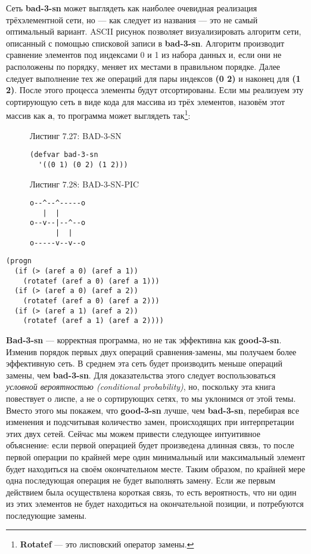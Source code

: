 Сеть \textbf{bad-3-sn} может выглядеть как наиболее очевидная реализация трёхэлементной сети, но --- как следует из названия --- это не самый оптимальный вариант. ASCII рисунок позволяет визуализировать алгоритм сети, описанный с помощью списковой записи в \textbf{bad-3-sn}. Алгоритм производит сравнение элементов под индексами 0 и 1 из набора данных и, если они не расположены по порядку, меняет их местами в правильном порядке. Далее следует выполнение тех же операций для пары индексов \textbf{(0 2)} и наконец для \textbf{(1 2)}. После этого процесса элементы будут отсортированы. Если мы реализуем эту сортирующую сеть в виде кода для массива из трёх элементов, назовём этот массив как \textbf{a}, то программа может выглядеть так\footnote{\textbf{Rotatef} --- это лисповский оператор замены.}:

\begin{figure}Листинг 7.27: BAD-3-SN\label{listing_7.27}
\listbegin
\begin{verbatim}
(defvar bad-3-sn
  '((0 1) (0 2) (1 2))) 
\end{verbatim}
\listend
\end{figure}

\begin{figure}Листинг 7.28: BAD-3-SN-PIC\label{listing_7.28}
\listbegin
\begin{verbatim}
o--^--^-----o
   |  |
o--v--|--^--o
      |  |
o-----v--v--o
\end{verbatim}
\listend
\end{figure}

\begin{verbatim}
(progn
  (if (> (aref a 0) (aref a 1))
    (rotatef (aref a 0) (aref a 1)))
  (if (> (aref a 0) (aref a 2))
    (rotatef (aref a 0) (aref a 2)))
  (if (> (aref a 1) (aref a 2))
    (rotatef (aref a 1) (aref a 2))))
\end{verbatim}

\textbf{Bad-3-sn} --- корректная программа, но не так эффективна как \textbf{good-3-sn}. Изменив порядок первых двух операций сравнения-замены, мы получаем более эффективную сеть. В среднем эта сеть будет производить меньше операций замены, чем \textbf{bad-3-sn}. Для доказательства этого следует воспользоваться \emph{условной вероятностью (conditional probability)}, но, поскольку эта книга повествует о лиспе, а не о сортирующих сетях, то мы уклонимся от этой темы. Вместо этого мы покажем, что \textbf{good-3-sn} лучше, чем \textbf{bad-3-sn}, перебирая все изменения и подсчитывая количество замен, происходящих при интерпретации этих двух сетей. Сейчас мы можем привести следующее интуитивное объяснение: если первой операцией будет произведена длинная связь, то после первой операции по крайней мере один минимальный или максимальный элемент будет находиться на своём окончательном месте. Таким образом, по крайней мере одна последующая операция не будет выполнять замену. Если же первым действием была осуществлена короткая связь, то есть вероятность, что ни один из этих элементов не будет находиться на окончательной позиции, и потребуются последующие замены.

